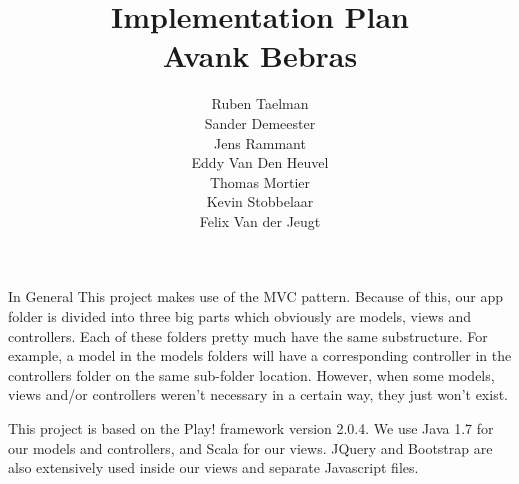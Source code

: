 \documentclass[]{article}
\author{
    Ruben Taelman \\
    Sander Demeester \\
    Jens Rammant \\
    Eddy Van Den Heuvel \\
    Thomas Mortier \\
    Kevin Stobbelaar \\
    Felix Van der Jeugt
}
\title{
    Implementation Plan \\
    Avank Bebras
}
\begin{document}
\maketitle

\tableofcontents
\clearpage

\begin{section}{In General}
    This project makes use of the MVC pattern. Because of this, our app folder is divided
    into three big parts which obviously are models, views and controllers. Each of these
    folders pretty much have the same substructure. For example, a model in the models
    folders will have a corresponding controller in the controllers folder on the same
    sub-folder location. However, when some models, views and/or controllers weren't
    necessary in a certain way, they just won't exist.
    
    This project is based on the Play! framework version 2.0.4. We use Java 1.7 for our
    models and controllers, and Scala for our views. JQuery and Bootstrap are also
    extensively used inside our views and separate Javascript files.
\end{section}
\end{document}
